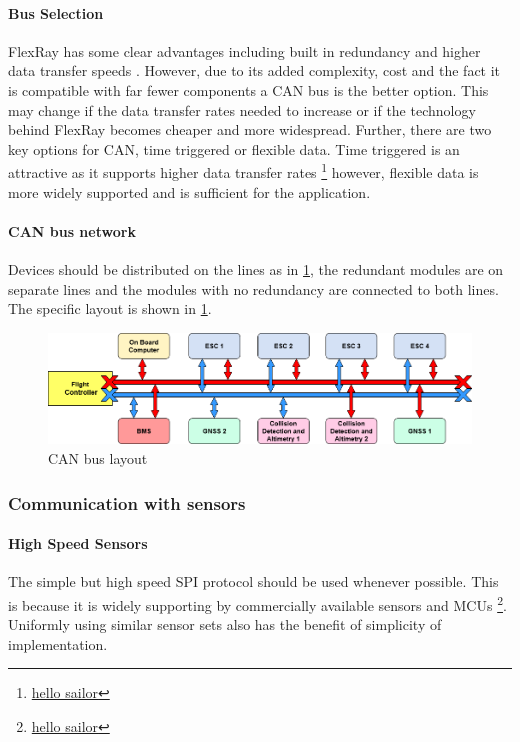 \paragraph{Bus Selection}
FlexRay has some clear advantages including built in redundancy and higher data transfer speeds \cite{REF}. However, due to its added complexity, cost and the fact it is compatible with far fewer components a \gls{CAN} bus is the better option. This may change if the data transfer rates needed to increase or if the technology behind FlexRay becomes cheaper and more widespread. Further, there are two key options for \gls{CAN}, time triggered or flexible data. Time triggered is an attractive as it supports higher data transfer rates \footnote{\url{hello sailor}} however, flexible data is more widely supported and is sufficient for the application.
\paragraph{CAN bus network}
Devices should be distributed on the lines as in \ref{fig:CAN_bus}, the redundant modules are on separate lines and the modules with no redundancy are connected to both lines. The specific layout is shown in \ref{fig:CAN_bus}.
 \begin{figure}[h!]
 \centering
  \includegraphics[width=1\textwidth]{figs/Thomas/Intra Communication/CAN bus.png}
 \caption{CAN bus layout}
 \label{fig:CAN_bus}
 \end{figure}
 
\subsubsection{Communication with sensors}
\paragraph{High Speed Sensors}
The simple but high speed \gls{SPI} protocol should be used whenever possible. This is because it is widely supporting by commercially available sensors and \gls{MCU}s \footnote{\url{hello sailor}}. Uniformly using similar sensor sets also has the benefit of simplicity of implementation.
